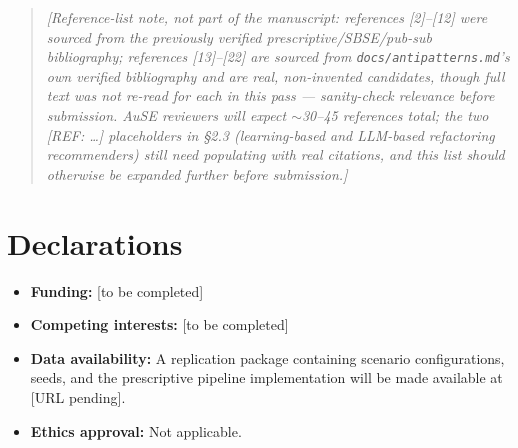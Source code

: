 \documentclass[11pt]{article}
\begin{document}
\begin{quote}
\emph{[Reference-list note, not part of the manuscript: references [2]--[12] were sourced from the
previously verified prescriptive/SBSE/pub-sub bibliography; references [13]--[22] are sourced from
\texttt{docs/antipatterns.md}'s own verified bibliography and are real, non-invented candidates, though
full text was not re-read for each in this pass --- sanity-check relevance before submission. AuSE
reviewers will expect $\sim$30--45 references total; the two [REF: \ldots] placeholders in \S2.3
(learning-based and LLM-based refactoring recommenders) still need populating with real citations, and
this list should otherwise be expanded further before submission.]}
\end{quote}

\section*{Declarations}

\begin{itemize}
\item \textbf{Funding:} [to be completed]
\item \textbf{Competing interests:} [to be completed]
\item \textbf{Data availability:} A replication package containing scenario configurations, seeds, and
  the prescriptive pipeline implementation will be made available at [URL pending].
\item \textbf{Ethics approval:} Not applicable.
\end{itemize}
\end{document}
